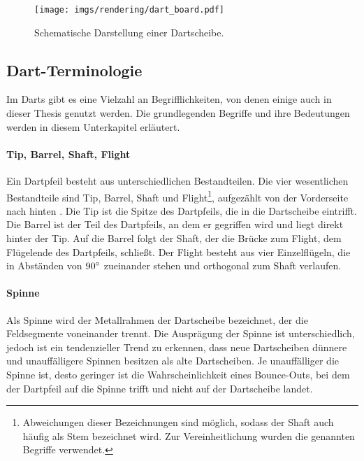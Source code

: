 \begin{figure}
    \centering
    \texttt{[image: imgs/rendering/dart\_board.pdf]}
    \caption{Schematische Darstellung einer Dartscheibe.}
    \label{img:dart_board}
\end{figure}



\subsection{Dart-Terminologie}
\label{sec:dart_terminologie}

Im Darts gibt es eine Vielzahl an Begrifflichkeiten, von denen einige auch in dieser Thesis genutzt werden. Die grundlegenden Begriffe und ihre Bedeutungen werden in diesem Unterkapitel erläutert.

\paragraph{Tip, Barrel, Shaft, Flight}

Ein Dartpfeil besteht aus unterschiedlichen Bestandteilen. Die vier wesentlichen Bestandteile sind Tip, Barrel, Shaft und Flight\footnote{Abweichungen dieser Bezeichnungen sind möglich, sodass der Shaft auch häufig als Stem bezeichnet wird. Zur Vereinheitlichung wurden die genannten Begriffe verwendet.}, aufgezählt von der Vorderseite nach hinten \cite{wdf-rules,pdc_rules}. Die Tip ist die Spitze des Dartpfeils, die in die Dartscheibe eintrifft. Die Barrel ist der Teil des Dartpfeils, an dem er gegriffen wird und liegt direkt hinter der Tip. Auf die Barrel folgt der Shaft, der die Brücke zum Flight, dem Flügelende des Dartpfeils, schließt. Der Flight besteht aus vier Einzelflügeln, die in Abständen von $90^{\circ}$ zueinander stehen und orthogonal zum Shaft verlaufen.

\paragraph{Spinne}

Als Spinne wird der Metallrahmen der Dartscheibe bezeichnet, der die Feldsegmente voneinander trennt. Die Ausprägung der Spinne ist unterschiedlich, jedoch ist ein tendenzieller Trend zu erkennen, dass neue Dartscheiben dünnere und unauffälligere Spinnen besitzen als alte Dartscheiben. Je unauffälliger die Spinne ist, desto geringer ist die Wahrscheinlichkeit eines Bounce-Outs, bei dem der Dartpfeil auf die Spinne trifft und nicht auf der Dartscheibe landet.

